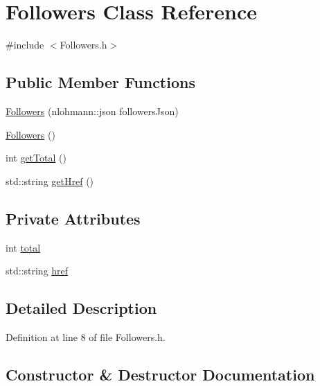 \hypertarget{class_followers}{}\section{Followers Class Reference}
\label{class_followers}


{\ttfamily \#include $<$Followers.\+h$>$}

\subsection*{Public Member Functions}
\begin{DoxyCompactItemize}
\item 
\mbox{\hyperlink{class_followers_a9422597e0bdc30628d4fc3f69f10baa6}{Followers}} (nlohmann\+::json followers\+Json)
\item 
\mbox{\hyperlink{class_followers_a6cba6b1748e64b3608991b650ab375b7}{Followers}} ()
\item 
int \mbox{\hyperlink{class_followers_a2314b173d6733b64e4c92d19602bc0ff}{get\+Total}} ()
\item 
std\+::string \mbox{\hyperlink{class_followers_a64d6f70d929f285866df9d3f439d954d}{get\+Href}} ()
\end{DoxyCompactItemize}
\subsection*{Private Attributes}
\begin{DoxyCompactItemize}
\item 
int \mbox{\hyperlink{class_followers_ac4385632adc7b63b6fcaf77499dbcdbb}{total}}
\item 
std\+::string \mbox{\hyperlink{class_followers_a13192d1a6d176d29d8cc70d490b6b978}{href}}
\end{DoxyCompactItemize}


\subsection{Detailed Description}


Definition at line 8 of file Followers.\+h.



\subsection{Constructor \& Destructor Documentation}
\mbox{\label{class_followers_a9422597e0bdc30628d4fc3f69f10baa6}} 

